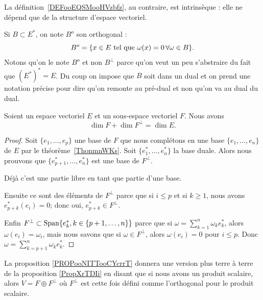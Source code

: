 La définition~\ref{DEFooEQSMooHVzbfz}, au contraire, est intrinsèque : elle ne dépend que de la structure d'espace vectoriel.

Si \( B\subset E^*\), on note \( B^o\) son orthogonal :
\begin{equation}
    B^o=\{ x\in E\text{ tel que } \omega(x)=0\,\forall \omega\in B \}.
\end{equation}
Notons qu'on le note \( B^o\) et non \( B^{\perp}\) parce qu'on veut un peu s'abstraire du fait que \( (E^*)^*=E\). Du coup on impose que \( B\) soit dans un dual et on prend une notation précise pour dire qu'on remonte au pré-dual et non qu'on va au dual du dual.

\begin{proposition} \label{PropXrTDIi}
    Soient un espace vectoriel \( E\) et un sous-espace vectoriel \( F\). Nous avons
    \begin{equation}
        \dim F+\dim F^{\perp}=\dim E.
    \end{equation}
\end{proposition}

\begin{proof}
    Soit \( \{ e_1,\ldots, e_p \}\) une base de \( F\) que nous complétons en une base \( \{ e_1,\ldots, e_n \}\) de \( E\) par le théorème~\ref{ThonmnWKs}. Soit \( \{ e_1^*,\ldots, e^*_n \}\) la base duale. Alors nous prouvons que \( \{ e^*_{p+1},\ldots, e_n^* \}\) est une base de \( F^{\perp}\).

    Déjà c'est une partie libre en tant que partie d'une base.

    Ensuite ce sont des éléments de \( F^{\perp}\) parce que si \( i\leq p\) et si \( k\geq 1\), nous avons \( e^*_{p+k}(e_i)=0\); donc oui, \( e^*_{p+k}\in F^{\perp}\).

    Enfin \( F^{\perp}\subset\operatorname{Span}\{ e_{k}^*, k \in \{p+1, \dots, n\}\}\) parce que si \( \omega=\sum_{k=1}^n\omega_ke_k^*\), alors \( \omega(e_i)=\omega_i\), mais nous savons que si \( \omega\in F^{\perp}\), alors \( \omega(e_i)=0\) pour \( i\leq p\). Donc \( \omega=\sum_{k=p+1}^n\omega_ke^*_k\).
\end{proof}

La proposition \ref{PROPooNITTooCYcrrT} donnera une version plus terre à terre de la proposition \ref{PropXrTDIi} en disant que si nous avons un produit scalaire, alors \( V=F\oplus F^{\perp}\) où \( F^{\perp}\) est cette fois défini comme l'orthogonal pour le produit scalaire.

